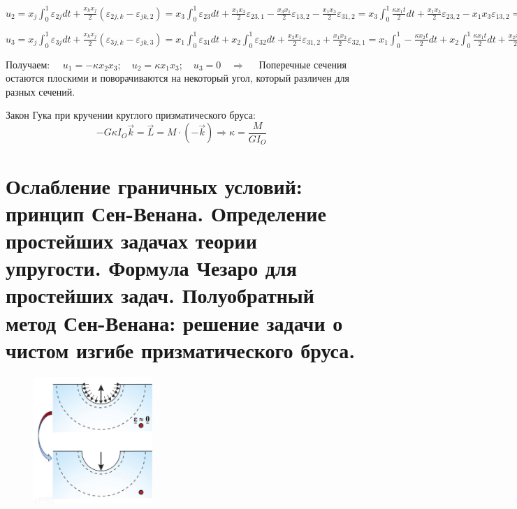 $ \displaystyle
u_2=x_j \int_0^1 \varepsilon_{2 j} d t+\frac{x_k x_j}{2}\left(\varepsilon_{2 j, k}-\varepsilon_{j k, 2}\right)=x_3 \int_0^1 \varepsilon_{23} d t+\frac{x_1 x_3}{2} \varepsilon_{23,1}-\frac{x_3 x_1}{2} \varepsilon_{13,2}-\frac{x_1 x_3}{2} \varepsilon_{31,2}=x_3 \int_0^1 \frac{\kappa x_1 t}{2} d t
+\frac{x_1 x_3}{2} \varepsilon_{23,2}-x_1 x_3 \varepsilon_{13,2}=\frac{\kappa}{2} x_1 x_3 \int_0^1 t d t+\frac{\kappa}{2} \frac{x_1 x_3}{2}+\frac{\kappa}{2} x_1 x_3=\frac{\kappa}{2} x_1 x_3 \frac{1}{2}+\frac{\kappa x_1 x_3}{4}+\frac{\kappa}{2} x_1 x_3=\kappa x_1 x_3$


$\displaystyle
u_3= x_j \int_0^1 \varepsilon_{3 j} d t+\frac{x_k x_j}{2}\left(\varepsilon_{3 j, k}-\varepsilon_{j k, 3}\right)=x_1 \int_0^1 \varepsilon_{31} d t+x_2 \int_0^1 \varepsilon_{32} d t+\frac{x_2 x_1}{2} \varepsilon_{31,2}+\frac{x_1 x_2}{2} \varepsilon_{32,1}=x_1 \int_0^1-\frac{\kappa x_2 t}{2} d t+x_2 \int_0^1 \frac{\kappa x_1 t}{2} d t+\frac{x_2 x_1}{2}(-\kappa)+\frac{x_1 x_2}{2} \kappa=0 $


Получаем: $\quad u_1=-\kappa x_2 x_3 ; \quad u_2=\kappa x_1 x_3; \quad u_3=0 \quad \Rightarrow \quad$ Поперечные сечения остаются
плоскими и поворачиваются на
некоторый угол, который
различен для разных сечений.


Закон Гука при кручении круглого призматического бруса:
$$
-G \kappa I_O \vec{k}={\vec{L}=M \cdot(-\vec{k})} \Rightarrow \kappa=\frac{M}{G I_O}
$$


\section{Ослабление граничных условий: принцип Сен-Венана. Определение простейших задачах теории упругости. Формула Чезаро для простейших задач. Полуобратный метод Сен-Венана: решение задачи о чистом изгибе призматического бруса.}

\begin{figure}[h!]
  \centering
  \includegraphics[width=0.4\textwidth]{images/14.1.jpg} 
\end{figure}


